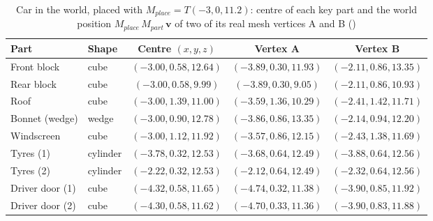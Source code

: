 \begin{table}[H]\centering\footnotesize
\caption{Car in the world, placed with $M_{place}=T(-3, 0, 11.2)$: centre of each key part and the world position $M_{place}\,M_{part}\,\mathbf{v}$ of two of its real mesh vertices A and B ()}\label{tab:world_car_red}
\begin{tabular}{@{}l l c c c@{}}
\toprule
Part & Shape & Centre $(x,y,z)$ & Vertex A & Vertex B \\
\midrule
Front block & cube & $(-3.00, 0.58, 12.64)$ & $(-3.89, 0.30, 11.93)$ & $(-2.11, 0.86, 13.35)$ \\
Rear block & cube & $(-3.00, 0.58, 9.99)$ & $(-3.89, 0.30, 9.05)$ & $(-2.11, 0.86, 10.93)$ \\
Roof & cube & $(-3.00, 1.39, 11.00)$ & $(-3.59, 1.36, 10.29)$ & $(-2.41, 1.42, 11.71)$ \\
Bonnet (wedge) & wedge & $(-3.00, 0.90, 12.78)$ & $(-3.86, 0.86, 13.35)$ & $(-2.14, 0.94, 12.20)$ \\
Windscreen & cube & $(-3.00, 1.12, 11.92)$ & $(-3.57, 0.86, 12.15)$ & $(-2.43, 1.38, 11.69)$ \\
Tyres (1) & cylinder & $(-3.78, 0.32, 12.53)$ & $(-3.68, 0.64, 12.49)$ & $(-3.88, 0.64, 12.56)$ \\
Tyres (2) & cylinder & $(-2.22, 0.32, 12.53)$ & $(-2.12, 0.64, 12.49)$ & $(-2.32, 0.64, 12.56)$ \\
Driver door (1) & cube & $(-4.32, 0.58, 11.65)$ & $(-4.74, 0.32, 11.38)$ & $(-3.90, 0.85, 11.92)$ \\
Driver door (2) & cube & $(-4.30, 0.58, 11.62)$ & $(-4.70, 0.33, 11.36)$ & $(-3.90, 0.83, 11.88)$ \\
\bottomrule
\end{tabular}
\end{table}
